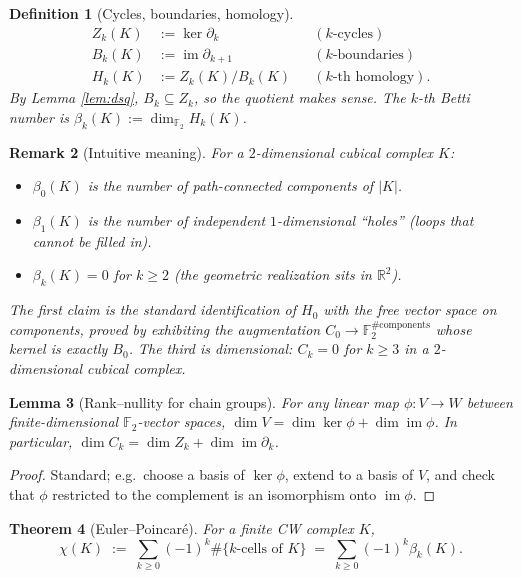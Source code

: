 \documentclass[11pt]{article}
\theoremstyle{persdef}
\newtheorem{definition}{Definition}[section]
\newtheorem{theorem}[definition]{Theorem}
\newtheorem{lemma}[definition]{Lemma}
\newtheorem{remark}[definition]{Remark}
\newcommand{\R}{\mathbb{R}}
\newcommand{\F}{\mathbb{F}}
\newcommand{\Ftwo}{\F_2}
\DeclareMathOperator{\imop}{im}
\DeclareMathOperator{\kerop}{ker}
\newcommand{\Hk}[1]{H_{#1}}
\newcommand{\Ck}[1]{C_{#1}}
\newcommand{\Zk}[1]{Z_{#1}}
\newcommand{\Bk}[1]{B_{#1}}
\newcommand{\bnd}{\partial}
\begin{document}
\begin{definition}[Cycles, boundaries, homology]\label{def:homology}
\begin{align*}
\Zk{k}(K) &:= \kerop\bnd_k && (\text{$k$-cycles})\\
\Bk{k}(K) &:= \imop\bnd_{k+1} && (\text{$k$-boundaries})\\
\Hk{k}(K) &:= \Zk{k}(K) / \Bk{k}(K) && (\text{$k$-th homology}).
\end{align*}
By Lemma \ref{lem:dsq}, $\Bk{k}\subseteq\Zk{k}$, so the quotient makes sense. The $k$-th \emph{Betti number} is $\beta_k(K):=\dim_{\Ftwo}\Hk{k}(K)$.
\end{definition}

\begin{remark}[Intuitive meaning]\label{rem:betti}
For a $2$-dimensional cubical complex $K$:
\begin{itemize}[leftmargin=2em,itemsep=0.2em]
  \item $\beta_0(K)$ is the number of path-connected components of $|K|$.
  \item $\beta_1(K)$ is the number of independent $1$-dimensional ``holes'' (loops that cannot be filled in).
  \item $\beta_k(K)=0$ for $k\geq 2$ (the geometric realization sits in $\R^2$).
\end{itemize}
The first claim is the standard identification of $\Hk{0}$ with the free vector space on components, proved by exhibiting the augmentation $\Ck{0}\to\Ftwo^{\#\text{components}}$ whose kernel is exactly $\Bk{0}$. The third is dimensional: $\Ck{k}=0$ for $k\geq 3$ in a $2$-dimensional cubical complex.
\end{remark}

\begin{lemma}[Rank--nullity for chain groups]\label{lem:ranknull}
For any linear map $\phi:V\to W$ between finite-dimensional $\Ftwo$-vector spaces, $\dim V = \dim \kerop\phi + \dim \imop\phi$. In particular, $\dim \Ck{k} = \dim \Zk{k} + \dim \imop\bnd_k$.
\end{lemma}

\begin{proof}
Standard; e.g.\ choose a basis of $\kerop\phi$, extend to a basis of $V$, and check that $\phi$ restricted to the complement is an isomorphism onto $\imop\phi$.
\end{proof}

\begin{theorem}[Euler--Poincar\'e]\label{thm:euler}
For a finite CW complex $K$,
\[
\chi(K) \;:=\; \sum_{k\geq 0} (-1)^k \#\{k\text{-cells of }K\} \;=\; \sum_{k\geq 0}(-1)^k \beta_k(K).
\]
\end{theorem}
\end{document}
